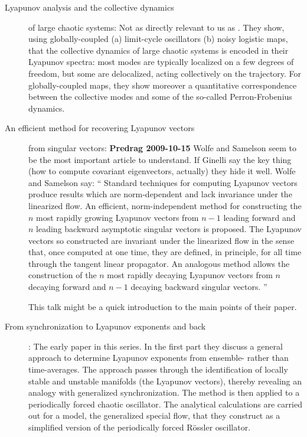 \begin{description}
\item[Lyapunov analysis and the collective dynamics]
of large chaotic systems:
Not as directly relevant to us as .
They show, using globally-coupled (a) limit-cycle oscillators
(b) noisy logistic maps, that the collective dynamics
of large chaotic systems is encoded in their Lyapunov spectra:
most modes are typically localized on a few degrees of freedom,
but some are delocalized, acting collectively on the trajectory.
For globally-coupled maps, they show moreover a quantitative
correspondence between the collective modes and some of the
so-called Perron-Frobenius dynamics.


\item[An efficient method for recovering Lyapunov vectors] from
singular vectors: {\bf Predrag 2009-10-15} Wolfe
and Samelson seem to be the most important article to
understand. If Ginelli \etal{} say the key
thing (how to compute covariant eigenvectors, actually) they
hide it well.
Wolfe and Samelson say: `` Standard techniques for computing
Lyapunov vectors produce results which are norm-dependent and
lack invariance under the linearized flow. An efficient,
norm-independent method for constructing the $n$ most rapidly
growing Lyapunov vectors from $n\!-\!1$ leading forward and  $n$
leading backward asymptotic singular vectors is proposed. The
Lyapunov vectors so constructed are invariant under the
linearized flow in the sense that, once computed at one time,
they are defined, in principle, for all time through the
tangent linear propagator.
			\toCB
An analogous method allows the
construction of the $n$ most rapidly decaying Lyapunov vectors
from $n$ decaying forward and $n\!-\!1$ decaying backward singular
vectors. ''

{This talk} might be a quick introduction to the main points of their
paper.

\item[From synchronization to Lyapunov exponents and
              back]:
The early paper in this series.
In the first part they discuss a general approach to determine
Lyapunov exponents from ensemble- rather than time-averages.
The approach passes through the identification of locally
stable and unstable manifolds (the Lyapunov vectors), thereby
revealing an analogy with generalized synchronization. The
method is then applied to a periodically forced chaotic
oscillator. The
analytical calculations are carried out for a model, the
generalized special flow, that they construct as a simplified
version of the periodically forced R\"ossler oscillator.


\end{description}
